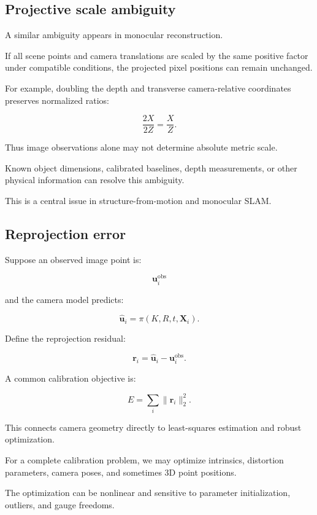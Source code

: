 \subsection{Projective scale ambiguity}\label{02-foundations-ii-ch035-projective-scale-ambiguity}

A similar ambiguity appears in monocular reconstruction.

If all scene points and camera translations are scaled by the same positive factor under compatible conditions, the projected pixel positions can remain unchanged.

For example, doubling the depth and transverse camera-relative coordinates preserves normalized ratios:

\[
 \frac{2X}{2Z}=\frac XZ.
\]

Thus image observations alone may not determine absolute metric scale.

Known object dimensions, calibrated baselines, depth measurements, or other physical information can resolve this ambiguity.

This is a central issue in structure-from-motion and monocular SLAM.

\subsection{Reprojection error}\label{02-foundations-ii-ch035-reprojection-error}

Suppose an observed image point is:

\[
 \mathbf u_i^{\mathrm{obs}}
\]

and the camera model predicts:

\[
 \hat{\mathbf u}_i= \pi(K,R,t,\mathbf X_i).
\]

Define the reprojection residual:

\[
 \boxed{ \mathbf r_i= \hat{\mathbf u}_i-\mathbf u_i^{\mathrm{obs}} }.
\]

A common calibration objective is:

\[
 \boxed{ E= \sum_i \|\mathbf r_i\|_2^2 }.
\]

This connects camera geometry directly to least-squares estimation and robust optimization.

For a complete calibration problem, we may optimize intrinsics, distortion parameters, camera poses, and sometimes 3D point positions.

The optimization can be nonlinear and sensitive to parameter initialization, outliers, and gauge freedoms.

